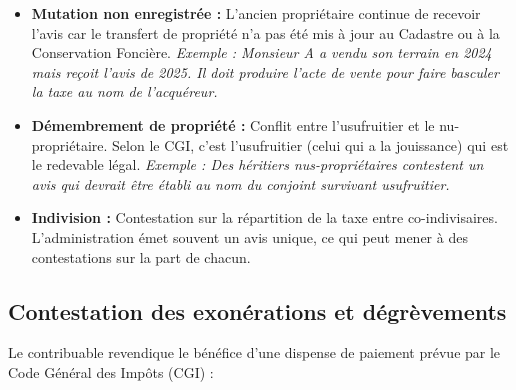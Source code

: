 \documentclass[Cours_contentieuxTF2026.tex]{subfiles}
\begin{document}
\begin{itemize}
	\item \textbf{Mutation non enregistrée :} L'ancien propriétaire continue de recevoir l'avis car le transfert de propriété n'a pas été mis à jour au Cadastre ou à la Conservation Foncière.
	\textit{Exemple : Monsieur A a vendu son terrain en 2024 mais reçoit l'avis de 2025. Il doit produire l'acte de vente pour faire basculer la taxe au nom de l'acquéreur.}
	
	\item \textbf{Démembrement de propriété :} Conflit entre l'usufruitier et le nu-propriétaire. Selon le CGI, c'est l'usufruitier (celui qui a la jouissance) qui est le redevable légal.
	\textit{Exemple : Des héritiers nus-propriétaires contestent un avis qui devrait être établi au nom du conjoint survivant usufruitier.}
	
	\item \textbf{Indivision :} Contestation sur la répartition de la taxe entre co-indivisaires. L'administration émet souvent un avis unique, ce qui peut mener à des contestations sur la part de chacun.
\end{itemize}

\subsection{Contestation des exonérations et dégrèvements}
Le contribuable revendique le bénéfice d'une dispense de paiement prévue par le Code Général des Impôts (CGI) :
\end{document}
